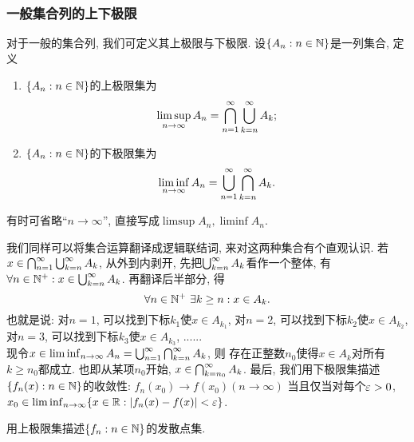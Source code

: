\subsubsection*{一般集合列的上下极限}
对于一般的集合列, 我们可定义其上极限与下极限. 
设$\{A_n: n \in \mathbb{N}\}$是一列集合, 定义
\begin{enumerate}
    \item $\{A_n: n \in \mathbb{N}\}$的上极限集为
    $$\limsup_{n\to \infty}A_n = \bigcap_{n=1}^{\infty}\bigcup_{k=n}^{\infty}A_k;$$
    \item $\{A_n: n \in \mathbb{N}\}$的下极限集为
    $$\liminf_{n\to \infty}A_n = \bigcup_{n=1}^{\infty}\bigcap_{k=n}^{\infty}A_k.$$
\end{enumerate}
\begin{remark}
    有时可省略“$n\to \infty$”, 直接写成$\limsup A_n, \liminf A_n$.
\end{remark}
我们同样可以将集合运算翻译成逻辑联结词, 来对这两种集合有个直观认识. 
若$x \in \bigcap_{n=1}^{\infty}\bigcup_{k=n}^{\infty}A_k$, 从外到内剥开, 先把$\bigcup_{k=n}^{\infty}A_k$看作一个整体, 有$\forall n \in \mathbb{N}^+: x \in \bigcup_{k=n}^{\infty}A_k$. 再翻译后半部分, 得$$\forall n \in \mathbb{N}^+ ~\exists k \geq n: x \in A_k.$$
也就是说: 对$n=1$, 可以找到下标$k_1$使$x \in A_{k_1}$, 对$n=2$, 可以找到下标$k_2$使$x \in A_{k_2}$,
对$n=3$, 可以找到下标$k_3$使$x \in A_{k_3}$, ...... \\
现令$x \in \liminf_{n\to \infty}A_n = \bigcup_{n=1}^{\infty}\bigcap_{k=n}^{\infty}A_k$, 则
存在正整数$n_0$使得$x \in A_k$对所有$k\geq n_0$都成立. 也即从某项$n_0$开始, $x \in \bigcap_{k=n_0}^{\infty}A_k$. 最后, 我们用下极限集描述$\{f_n(x): n \in \mathbb{N}\}$的收敛性:
$f_n(x_0) \to f(x_0) (n \to \infty)$ 当且仅当对每个$\varepsilon>0$, 
$x_0 \in \liminf_{n\to \infty}\{x \in \mathbb{R}: |f_n(x)-f(x)| < \varepsilon\}$.
\begin{exercise}
    用上极限集描述$\{f_n:n \in \mathbb{N}\}$的发散点集.
\end{exercise}

